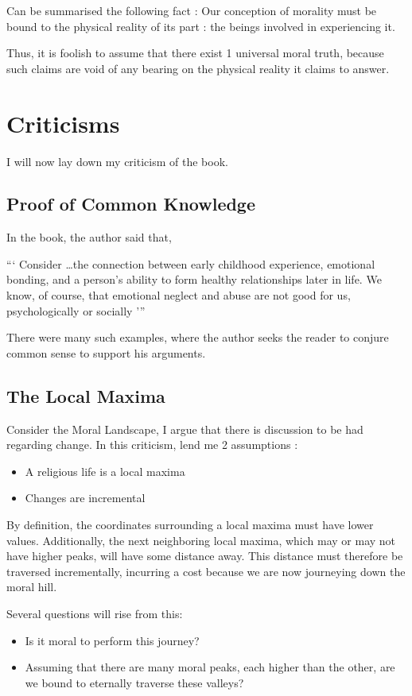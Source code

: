 \documentclass[a4paper,12pt]{extbook}
\begin{document}
Can be summarised the following fact :
Our conception of morality must be bound to the physical reality of its part : the beings involved in experiencing it.

Thus, it is foolish to assume that there exist 1 universal moral truth, because such claims are void of any bearing on the physical reality it claims to answer.

\newpage
\section{Criticisms}

I will now lay down my criticism of the book.

\subsection{Proof of Common Knowledge}

In the book, the author said that,

```
Consider \dots the connection between early childhood experience, emotional bonding, and a person’s ability to form healthy relationships later in life.
We know, of course, that emotional neglect and abuse are not good for us, psychologically or socially
'''

There were many such examples, where the author seeks the reader to conjure common sense to support his arguments.

\subsection{The Local Maxima}

Consider the Moral Landscape, I argue that there is discussion to be had regarding change.
In this criticism, lend me 2 assumptions :

\begin{itemize}
    \item A religious life is a local maxima
    \item Changes are incremental
\end{itemize}

By definition, the coordinates surrounding a local maxima must have lower values.
Additionally, the next neighboring local maxima, which may or may not have higher peaks, will have some distance away.
This distance must therefore be traversed incrementally, incurring a cost because we are now journeying down the moral hill.

Several questions will rise from this:

\begin{itemize}
    \item Is it moral to perform this journey?
    \item Assuming that there are many moral peaks, each higher than the other, are we bound to eternally traverse these valleys?
\end{itemize}
\end{document}

